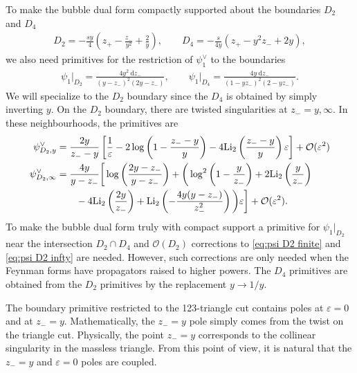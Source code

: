 \documentclass[11pt]{article}
\renewcommand{\d}{\text{d}}
\newcommand{\nn}{\nonumber}
\renewcommand{\O}{\mathcal{O}}
\newcommand{\Li}{{\rm Li}}
\newcommand{\vep}{\varepsilon}
\begin{document}
To make the bubble dual form compactly supported about the boundaries $D_2$ and $D_4$
\begin{align}
	D_2 = -\frac{sy}{4} \left( z_+ - \frac{z_-}{y^2} + \frac{2}{y} \right),
	\qquad 
	D_4 = -\frac{s}{4y} \left( z_+ - y^2 z_- + 2y \right),
\end{align}
we also need primitives for the restriction of $\psi_1^\vee$ to the boundaries
\begin{align}
	\psi_1\vert_{D_2} = \frac{4y^2\ \d z_-}{(y-z_-)^2(2y-z_-)},
	\qquad 
	\psi_1\vert_{D_4} = \frac{4y\ \d z_-}{(1-yz_-)^2(2-yz_-)}.
\end{align}
We will specialize to the $D_2$ boundary since the $D_4$ is obtained by simply inverting $y$. On the $D_2$ boundary, there are twisted singularities at $z_- = y,\infty$. In these neighbourhoods, the primitives are
\begin{align} 
\label{eq:psi D2 finite}
	\psi^\vee_{D_2,y}
	&= \frac{2y}{z_--y} 
	\left[
		\frac{1}{\vep}
		- 2 \log\left( 1-\frac{z_--y}{y} \right) 
		- 4 \Li_2\left(\frac{z_--y}{y}\right) \vep
	\right]
	+ \O(\vep^2)
\\
\label{eq:psi D2 infty}
	\psi^\vee_{D_2,\infty }
	&= \frac{4y}{y-z_-} 
	\bigg[
		\log\left(\frac{2y-z_-}{y-z_-}\right)
		+\bigg(
			\log^2\left(1-\frac{y}{z_-}\right)
			+ 2 \Li_2\left(\frac{y}{z_-}\right)
		\nn\\&\qquad 
			- 4 \Li_2\left(\frac{2y}{z_-}\right)
			+ \Li_2\left(-\frac{4y(y-z_-)}{z_-^2}\right)
		\bigg)\vep
	\bigg]
	+ \O(\vep^2).
\end{align}
To make the bubble dual form truly with compact support a primitive for $\psi_1\vert_{D_2}$ near the intersection $D_2 \cap D_4$ and $\O(D_2)$ corrections to \eqref{eq:psi D2 finite} and \eqref{eq:psi D2 infty} are needed. However, such corrections are only needed when the Feynman forms have propagators raised to higher powers. The $D_4$ primitives are obtained from the $D_2$ primitives by the replacement $y\to1/y$.

The boundary primitive restricted to the 123-triangle cut contains poles at $\vep=0$ and at $z_- =y$. Mathematically, the $z_-=y$ pole simply comes from the twist on the triangle cut. Physically, the point $z_-=y$ corresponds to the collinear singularity in the massless triangle. From this point of view, it is natural that the $z_-=y$ and $\vep=0$ poles are coupled. 
\end{document}
